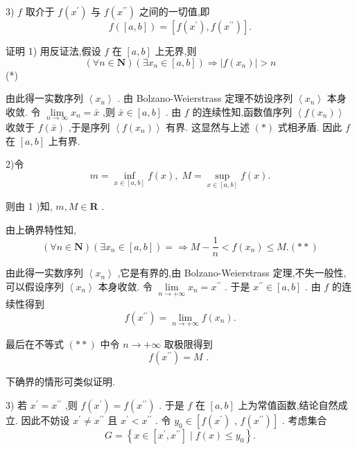 3) $f$ 取介于 $f\left( {x}^{\prime }\right)$ 与 $f\left( {x}^{\prime \prime }\right)$ 之间的一切值,即
$$f\left( \left\lbrack  {a,b}\right\rbrack  \right)  = \left\lbrack  {f\left( {x}^{\prime }\right) ,f\left( {x}^{\prime \prime }\right) }\right\rbrack  .$$

证明 1) 用反证法,假设 $f$ 在 $\left\lbrack  {a,b}\right\rbrack$ 上无界,则
$$\left( {\forall n \in  \mathbf{N}}\right) \left( {\exists {x}_{n} \in  \left\lbrack  {a,b}\right\rbrack  }\right)  \Rightarrow  \left| {f\left( {x}_{n}\right) }\right|  > n$$
(*)

由此得一实数序列 $\left\langle  {x}_{n}\right\rangle$ . 由 Bolzano-Weierstrass 定理不妨设序列 $\left\langle  {x}_{n}\right\rangle$ 本身收敛. 令 $\mathop{\lim }\limits_{{n \rightarrow  \infty }}{x}_{n} = \bar{x}$ ,则 $\bar{x} \in  \left\lbrack  {a,b}\right\rbrack$ . 由 $f$ 的连续性知,函数值序列 $\left\langle  {f\left( {x}_{n}\right) }\right\rangle$ 收敛于 $f\left( \bar{x}\right)$ ,于是序列 $\left\langle  {f\left( {x}_{n}\right) }\right\rangle$ 有界. 这显然与上述 $\left( *\right)$ 式相矛盾. 因此 $f$ 在 $\left\lbrack  {a,b}\right\rbrack$ 上有界.

2)令
$$m = \mathop{\inf }\limits_{{x \in  \left\lbrack  {a,b}\right\rbrack  }}f\left( x\right) ,\;M = \mathop{\sup }\limits_{{x \in  \left\lbrack  {a,b}\right\rbrack  }}f\left( x\right) .$$

则由 1 )知, $m,M \in  \mathbf{R}$ .

由上确界特性知,
$$\left( {\forall n \in  \mathbf{N}}\right) \left( {\exists {x}_{n} \in  \left\lbrack  {a,b}\right\rbrack  }\right)  =  \Rightarrow  M - \frac{1}{n} < f\left( {x}_{n}\right)  \leq  M.\left( {* * }\right)$$

由此得一实数序列 $\left\langle  {x}_{n}\right\rangle$ ,它是有界的,由 Bolzano-Weierstrass 定理,不失一般性,可以假设序列 $\left\langle  {x}_{n}\right\rangle$ 本身收敛. 令 $\mathop{\lim }\limits_{{n \rightarrow   + \infty }}{x}_{n} = {x}^{\prime \prime }$ . 于是 ${x}^{\prime \prime } \in  \left\lbrack  {a,b}\right\rbrack$ . 由 $f$ 的连续性得到
$$f\left( {x}^{\prime \prime }\right)  = \mathop{\lim }\limits_{{n \rightarrow   + \infty }}f\left( {x}_{n}\right) .$$

最后在不等式 $\left( {* * }\right)$ 中令 $n \rightarrow   + \infty$ 取极限得到
$$f\left( {x}^{\prime \prime }\right)  = M\text{ . }$$

下确界的情形可类似证明.

3) 若 ${x}^{\prime } = {x}^{\prime \prime }$ ,则 $f\left( {x}^{\prime }\right)  = f\left( {x}^{\prime \prime }\right)$ . 于是 $f$ 在 $\left\lbrack  {a,b}\right\rbrack$ 上为常值函数,结论自然成立. 因此不妨设 ${x}^{\prime } \neq  {x}^{\prime \prime }$ 且 ${x}^{\prime } < {x}^{\prime \prime }$ . 令 ${y}_{0} \in  \left\lbrack  {f\left( {x}^{\prime }\right) }\right.$ , $\left. {f\left( {x}^{\prime \prime }\right) }\right\rbrack$ . 考虑集合
$$G = \left\{  {x \in  \left\lbrack  {{x}^{\prime },{x}^{\prime \prime }}\right\rbrack   \mid  f\left( x\right)  \leq  {y}_{0}}\right\}  .$$

